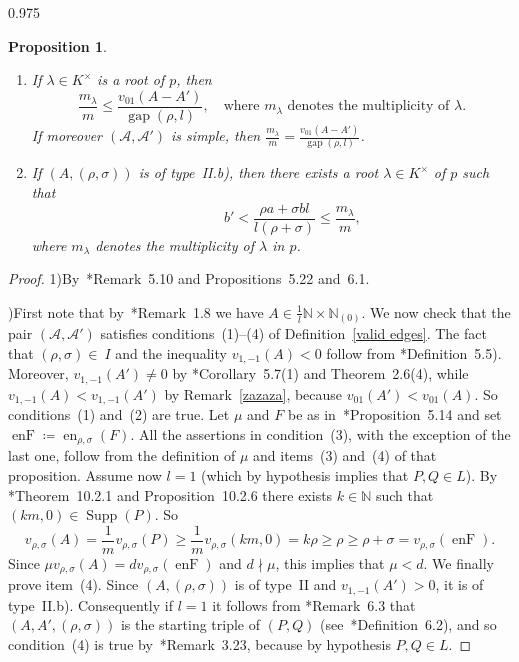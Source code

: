 \documentclass[reqno,a4paper,twoside]{amsart}
\newtheorem{proposition}[theorem]{Proposition}
\theoremstyle{definition}
\theoremstyle{remark}
\DeclareMathOperator{\gap}{gap}
\DeclareMathOperator{\Supp}{Supp}
\DeclareMathOperator{\en}{en}
\DeclareMathOperator{\enF}{enF}
\begin{document}
\begin{spacing}{0.975}
\begin{proposition}
\begin{enumerate}[itemsep=1.0ex,topsep=1.0ex]
\item If $\lambda\in K^{\times}$ is a root of $p$, then
$$
\frac{m_{\lambda}}{m}\le \frac{v_{01}(A-A')}{\gap(\rho,l)},\quad\text{where $m_{\lambda}$ denotes the multiplicity of $\lambda$.}
$$
If moreover $(\mathcal{A},\mathcal{A}')$ is simple, then $\frac{m_{\lambda}}{m}= \frac{v_{01}(A-A')}{\gap(\rho,l)}$.

\item If $(A,(\rho,\sigma))$ is of type~II.b), then there exists a root $\lambda\in K^{\times}$ of $p$ such that
    \begin{equation}\label{5.16}
    \quad\qquad b'< \frac{\rho a + \sigma b l}{l(\rho+\sigma)} \le \frac{m_{\lambda}}{m},
    \end{equation}
where $m_{\lambda}$ denotes the multiplicity of $\lambda$ in $p$.

\end{enumerate}
\end{proposition}

\begin{proof} 1)\enspace By~\cite{GGV1}*{Remark~5.10 and Propositions~5.22 and~6.1}.

\smallskip

)\enspace First note that by~\cite{GGV1}*{Remark~1.8} we have $A\in \frac{1}{l}\mathds{N}\times \mathds{N}_{(0)}$. We now check that the pair $(\mathcal{A},\mathcal{A}')$ satisfies conditions~(1)--(4) of Definition~\ref{valid edges}. The fact that $(\rho,\sigma)\in~I$ and the inequality $v_{1,-1}(A)<0$ follow from \cite{GGV1}*{Definition~5.5}). Moreover, $v_{1,-1}(A')\ne 0$ by \cite{GGV1}*{Corollary~5.7(1) and Theorem~2.6(4)}, while $v_{1,-1}(A)<v_{1,-1}(A')$ by Remark~\ref{zazaza}, because $v_{01}(A')<v_{01}(A)$. So conditions~(1) and~(2) are true. Let $\mu$ and $F$ be as in~\cite{GGV1}*{Proposition~5.14} and set $\enF\coloneqq \en_{\rho,\sigma}(F)$. All the assertions in condition~(3), with the exception of the last one, follow from the definition of $\mu$ and items~(3) and~(4) of that proposition. Assume now $l=1$ (which by hypothesis implies that $P,Q\in L$). By \cite{vdE}*{Theorem~10.2.1 and Proposition~10.2.6} there exists $k\in \mathds{N}$ such that $(km,0)\in \Supp(P)$. So
$$
v_{\rho,\sigma}(A)=\frac 1m v_{\rho,\sigma}(P)\ge \frac 1m v_{\rho,\sigma}(km,0)=k\rho\ge\rho\ge \rho+\sigma = v_{\rho,\sigma}(\enF).
$$
Since $\mu v_{\rho,\sigma}(A) = d v_{\rho,\sigma}(\enF)$ and $d\nmid \mu$, this implies that $\mu<d$. We finally prove item~(4). Since $(A,(\rho,\sigma))$ is of type~II and $v_{1,-1}(A')>0$, it is of type~II.b). Consequently if $l=1$ it follows from \cite{GGV1}*{Remark~6.3} that $(A,A',(\rho,\sigma))$ is the starting triple of $(P,Q)$ (see~\cite{GGV1}*{Definition~6.2}), and so condition~(4) is true by~\cite{GGV2}*{Remark~3.23}, because by hypothesis $P,Q\in L$.


\end{proof}
\end{spacing}
\end{document}
